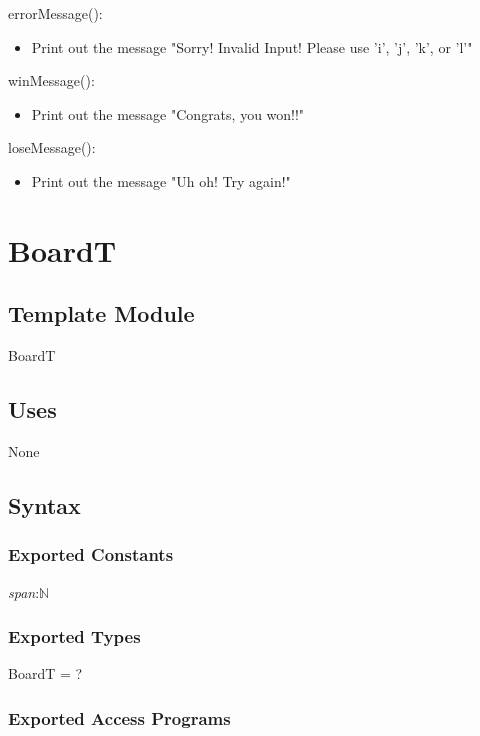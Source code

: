 \documentclass[12pt]{article}
\begin{document}
\noindent errorMessage():
\begin{itemize}
\item Print out the message "Sorry! Invalid Input! Please use 'i', 'j', 'k', or 'l'"
\end{itemize} 

\noindent winMessage():
\begin{itemize}
\item Print out the message "Congrats, you won!!"
\end{itemize} 

\noindent loseMessage():
\begin{itemize}
\item Print out the message "Uh oh! Try again!"
\end{itemize} 

\newpage

\section* {BoardT}

\subsection*{Template Module}

BoardT

\subsection* {Uses}

None

\subsection* {Syntax}

\subsubsection* {Exported Constants}

\textit{span}:$\mathbb{N}$

\subsubsection* {Exported Types}

BoardT = ?

\subsubsection* {Exported Access Programs}
\end{document}
